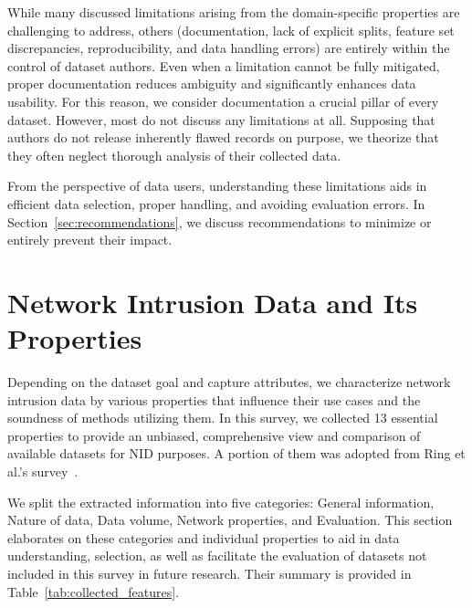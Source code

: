 While many discussed limitations arising from the domain-specific properties are challenging to address, others (documentation, lack of explicit splits, feature set discrepancies, reproducibility, and data handling errors) are entirely within the control of dataset authors. Even when a limitation cannot be fully mitigated, proper documentation reduces ambiguity and significantly enhances data usability. For this reason, we consider documentation a crucial pillar of every dataset. However, most do not discuss any limitations at all. Supposing that authors do not release inherently flawed records on purpose, we theorize that they often neglect thorough analysis of their collected data.

From the perspective of data users, understanding these limitations aids in efficient data selection, proper handling, and avoiding evaluation errors. In Section~\ref{sec:recommendations}, we discuss recommendations to minimize or entirely prevent their impact.


\section{Network Intrusion Data and Its Properties}
\label{sec:data_props}

Depending on the dataset goal and capture attributes, we characterize network intrusion data by various properties that influence their use cases and the soundness of methods utilizing them. In this survey, we collected 13 essential properties to provide an unbiased, comprehensive view and comparison of available datasets for NID purposes. A portion of them was adopted from Ring et al.'s survey~\cite{ring2019_nids_datasets_survey}. 

We split the extracted information into five categories: General information, Nature of data, Data volume, Network properties, and Evaluation. This section elaborates on these categories and individual properties to aid in data understanding, selection, as well as facilitate the evaluation of datasets not included in this survey in future research. Their summary is provided in Table~\ref{tab:collected_features}.

